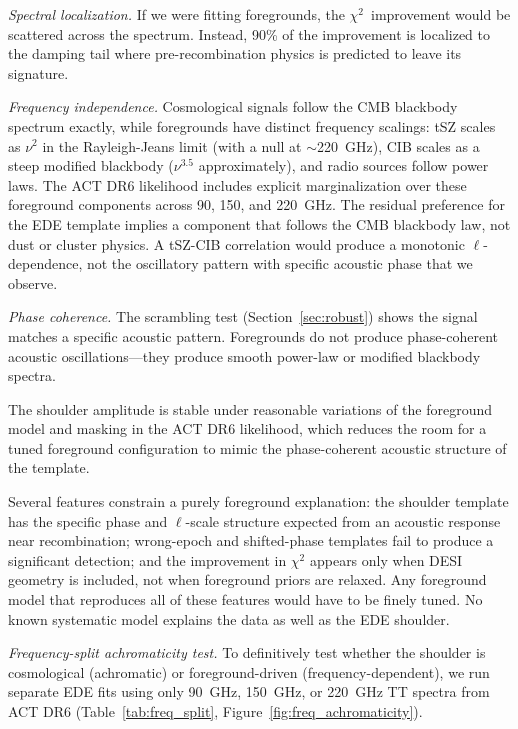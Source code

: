 \documentclass[twocolumn,showpacs,preprintnumbers,amsmath,amssymb,prd]{revtex4-2}
\newcommand{\chisq}{$\chi^2$}
\begin{document}
\emph{Spectral localization.} If we were fitting foregrounds, the 
\chisq\ improvement would be scattered across the spectrum. Instead, 
90\% of the improvement is localized to the damping tail where 
pre-recombination physics is predicted to leave its signature.

\emph{Frequency independence.} Cosmological signals follow the CMB blackbody 
spectrum exactly, while foregrounds have distinct frequency scalings: tSZ 
scales as $\nu^2$ in the Rayleigh-Jeans limit (with a null at $\sim$220~GHz), 
CIB scales as a steep modified blackbody ($\nu^{3.5}$ approximately), and 
radio sources follow power laws. The ACT DR6 likelihood includes explicit 
marginalization over these foreground components across 90, 150, and 220~GHz. 
The residual preference for the EDE template implies a component that follows 
the CMB blackbody law, not dust or cluster physics. A tSZ-CIB correlation 
would produce a monotonic $\ell$-dependence, not the oscillatory pattern 
with specific acoustic phase that we observe.

\emph{Phase coherence.} The scrambling test 
(Section~\ref{sec:robust}) shows the signal matches a specific acoustic 
pattern. Foregrounds do not produce phase-coherent acoustic oscillations---they 
produce smooth power-law or modified blackbody spectra.

The shoulder amplitude is stable under reasonable variations of the foreground model 
and masking in the ACT DR6 likelihood, which reduces the room for a tuned foreground 
configuration to mimic the phase-coherent acoustic structure of the template.

Several features constrain a purely foreground 
explanation: the shoulder template has the specific phase and $\ell$-scale structure 
expected from an acoustic response near recombination; wrong-epoch and shifted-phase 
templates fail to produce a significant detection; and the improvement in $\chi^2$ 
appears only when DESI geometry is included, not when foreground priors are relaxed. 
Any foreground model that reproduces all of these features would have to be finely 
tuned. No known systematic model explains the data as well as the EDE shoulder.

\emph{Frequency-split achromaticity test.} To definitively test whether the shoulder
is cosmological (achromatic) or foreground-driven (frequency-dependent), we run 
separate EDE fits using only 90~GHz, 150~GHz, or 220~GHz TT spectra from ACT DR6
(Table~\ref{tab:freq_split}, Figure~\ref{fig:freq_achromaticity}).
\end{document}
